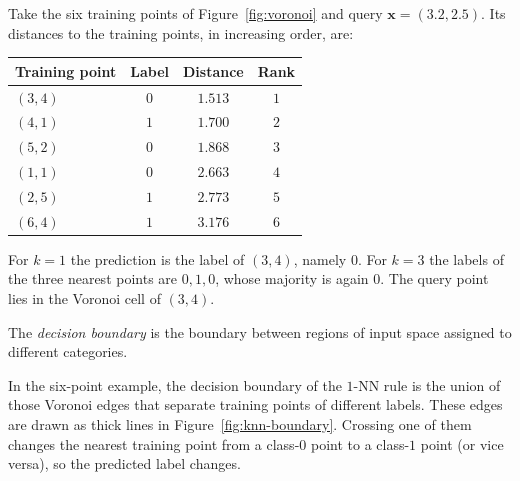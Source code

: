 \documentclass[a4paper, 12pt]{book}
\begin{document}
\begin{example}
    Take the six training points of Figure~\ref{fig:voronoi} and query
    $\mathbf{x}=(3.2,2.5)$. Its distances to the training points, in increasing
    order, are:
    \begin{center}
    \begin{tabular}{@{}lccc@{}}
        \toprule
        Training point & Label & Distance & Rank \\
        \midrule
        $(3,4)$ & $0$ & $1.513$ & $1$ \\
        $(4,1)$ & $1$ & $1.700$ & $2$ \\
        $(5,2)$ & $0$ & $1.868$ & $3$ \\
        $(1,1)$ & $0$ & $2.663$ & $4$ \\
        $(2,5)$ & $1$ & $2.773$ & $5$ \\
        $(6,4)$ & $1$ & $3.176$ & $6$ \\
        \bottomrule
    \end{tabular}
    \end{center}
    For $k=1$ the prediction is the label of $(3,4)$, namely $0$. For $k=3$ the
    labels of the three nearest points are $0,1,0$, whose majority is again $0$.
    The query point lies in the Voronoi cell of $(3,4)$.
\end{example}

The \emph{decision boundary} is the boundary between regions of input space assigned to different categories. 

\begin{example}
    In the six-point example, the decision boundary of the $1$-NN rule is the
    union of those Voronoi edges that separate training points of different
    labels. These edges are drawn as thick lines in
    Figure~\ref{fig:knn-boundary}. Crossing one of them changes the nearest
    training point from a class-$0$ point to a class-$1$ point (or vice versa),
    so the predicted label changes.
\end{example}
\end{document}
